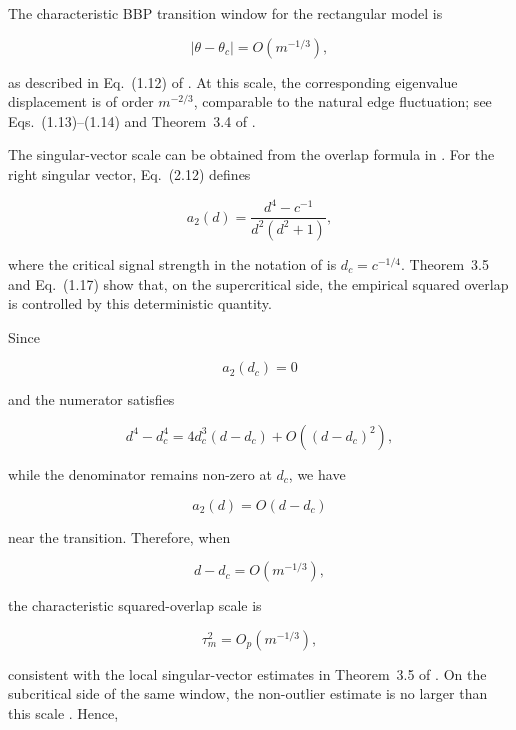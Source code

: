The characteristic BBP transition window for the rectangular model is

\begin{equation}
|\theta-\theta_c|
=
O(m^{-1/3}),
\end{equation}

as described in Eq.~(1.12) of \cite{ding2020high}. At this scale, the
corresponding eigenvalue displacement is of order $m^{-2/3}$, comparable
to the natural edge fluctuation; see Eqs.~(1.13)--(1.14) and
Theorem~3.4 of \cite{ding2020high}.

The singular-vector scale can be obtained from the overlap formula in
\cite{ding2020high}. For the right singular vector, Eq.~(2.12) defines

\begin{equation}
a_2(d)
=
\frac{d^4-c^{-1}}
{d^2(d^2+1)},
\end{equation}

where the critical signal strength in the notation of
\cite{ding2020high} is $d_c=c^{-1/4}$. Theorem~3.5 and Eq.~(1.17)
show that, on the supercritical side, the empirical squared overlap is
controlled by this deterministic quantity.

Since

\begin{equation}
a_2(d_c)=0
\end{equation}

and the numerator satisfies

\begin{equation}
d^4-d_c^4
=
4d_c^3(d-d_c)
+
O((d-d_c)^2),
\end{equation}

while the denominator remains non-zero at $d_c$, we have

\begin{equation}
a_2(d)
=
O(d-d_c)
\end{equation}

near the transition. Therefore, when

\begin{equation}
d-d_c
=
O(m^{-1/3}),
\end{equation}

the characteristic squared-overlap scale is

\begin{equation}
\tau_m^2
=
O_p(m^{-1/3}),
\end{equation}

consistent with the local singular-vector estimates in
Theorem~3.5 of \cite{ding2020high}. On the subcritical side of the
same window, the non-outlier estimate is no larger than this scale
\cite{ding2020high}. Hence,

